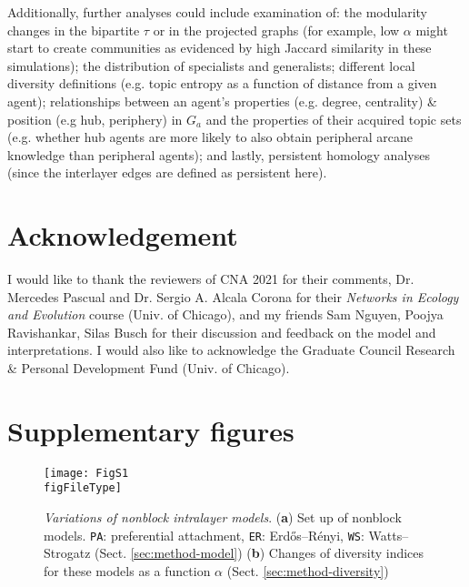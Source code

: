 \documentclass{svproc}
\def\figFileType{.eps}
\begin{document}
Additionally, further analyses could include examination of:
    the modularity changes in the bipartite $\tau$ \cite{Dankulov2015-uv} or in the projected graphs (for example, low $\alpha$ might start to create communities as evidenced by high Jaccard similarity in these simulations);
    the distribution of specialists and generalists;
    different local diversity definitions (e.g. topic entropy as a function of distance from a given agent);
    relationships between an agent's properties (e.g. degree, centrality) \& position (e.g hub, periphery) in $G_a$ and the properties of their acquired topic sets (e.g. whether hub agents are more likely to also obtain peripheral arcane knowledge than peripheral agents);
    and lastly, persistent homology analyses (since the interlayer edges are defined as persistent here).


\section{Acknowledgement}

I would like to thank
    the reviewers of CNA 2021 for their comments,
    Dr. Mercedes Pascual and Dr. Sergio A. Alcala Corona for their \textit{Networks in Ecology and Evolution} course (Univ. of Chicago),
    and my friends
        Sam Nguyen,
        Poojya Ravishankar,
        Silas Busch
for their discussion and feedback on the model and interpretations.
I would also like to acknowledge the Graduate Council Research \& Personal Development Fund (Univ. of Chicago).




\vspace{-2em}

\section*{Supplementary figures}

\setcounter{figure}{0}
\renewcommand{\thefigure}{S\arabic{figure}}

\begin{figure}[!ht]
    \centering
    \texttt{[image: FigS1\\figFileType]}
    \caption{
    \textit{Variations of nonblock intralayer models}.
    (\textbf{a}) Set up of nonblock models.
    \texttt{PA}: preferential attachment,
    \texttt{ER}: Erdős–Rényi,
    \texttt{WS}: Watts–Strogatz (Sect. \ref{sec:method-model})
    (\textbf{b}) Changes of diversity indices for these models as a function $\alpha$ (Sect. \ref{sec:method-diversity})
    }
    \label{supp:1}
\end{figure}
\end{document}
